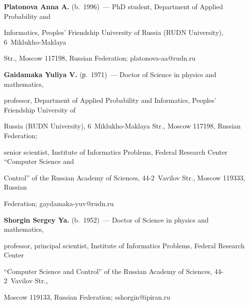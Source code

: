 \noindent


\textbf{Platonova Anna A.} (b.\ 1996)~--- PhD student, Department of Applied Probability and 


Informatics, Peoples' Friendship University of Russia (RUDN University), 6~Miklukho-Maklaya 


Str., Moscow 117198, Russian Federation; \mbox{platonova-aa@rudn.ru}








\vspace*{3pt}





\noindent


\textbf{Gaidamaka Yuliya V.} (р.\ 1971)~--- Doctor of Science in physics and mathematics, 


professor, Department of Applied Probability and Informatics, Peoples' Friendship University of 


Russia (RUDN University), 6~Miklukho-Maklaya Str., Moscow 117198, Russian Federation; 


senior scientist, Institute of Informatics Problems, Federal Research Center ``Computer Science and 


Control'' of the Russian Academy of Sciences, 44-2~Vavilov Str., Moscow 119333, Russian 


Federation; \mbox{gaydamaka-yuv@rudn.ru}





\vspace*{3pt}





\noindent


\textbf{Shorgin Sergey Ya.} (b.\ 1952)~--- Doctor of Science in physics and mathematics, 


professor, principal scientist, Institute of Informatics Problems, Federal Research Center 


``Computer Science and Control'' of the Russian Academy of Sciences, 44-2~Vavilov Str., 


Moscow 119133, Russian Federation; \mbox{sshorgin@ipiran.ru}





\label{end\stat}





\renewcommand{\bibname}{\protect\rm Литература} 


